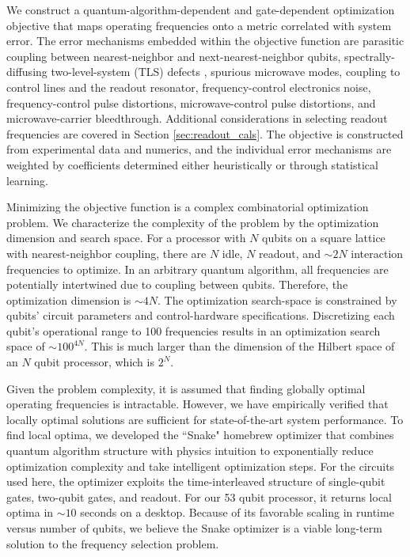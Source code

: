 We construct a quantum-algorithm-dependent and gate-dependent optimization objective that maps operating frequencies onto a metric correlated with system error.  The error mechanisms embedded within the objective function are parasitic coupling between nearest-neighbor and next-nearest-neighbor qubits, spectrally-diffusing two-level-system (TLS) defects \cite{paultls}, spurious microwave modes, coupling to control lines and the readout resonator, frequency-control electronics noise, frequency-control pulse distortions, microwave-control pulse distortions, and microwave-carrier bleedthrough. Additional considerations in selecting readout frequencies are covered in Section \ref{sec:readout_cals}. The objective is constructed from experimental data and numerics, and the individual error mechanisms are weighted by coefficients determined either heuristically or through statistical learning. 

Minimizing the objective function is a complex combinatorial optimization problem. We characterize the complexity of the problem by the optimization dimension and search space. For a processor with $N$ qubits on a square lattice with nearest-neighbor coupling, there are $N$ idle, $N$ readout, and $\sim2N$ interaction frequencies to optimize. In an arbitrary quantum algorithm, all frequencies are potentially intertwined due to coupling between qubits. Therefore, the optimization dimension is $\sim4N$. The optimization search-space is constrained by qubits' circuit parameters and control-hardware specifications. Discretizing each qubit's operational range to 100 frequencies results in an optimization search space of $\sim100^{4N}$. This is much larger than the dimension of the Hilbert space of an $N$ qubit processor, which is $2^N$. 

Given the problem complexity, it is assumed that finding globally optimal operating frequencies is intractable.  However, we have empirically verified that locally optimal solutions are sufficient for state-of-the-art system performance. To find local optima, we developed the ``Snake" homebrew optimizer that combines quantum algorithm structure with physics intuition to exponentially reduce optimization complexity and take intelligent optimization steps. For the circuits used here, the optimizer exploits the time-interleaved structure of single-qubit gates, two-qubit gates, and readout. For our 53 qubit processor, it returns local optima in $\sim10$ seconds on a desktop. Because of its favorable scaling in runtime versus number of qubits, we believe the Snake optimizer is a viable long-term solution to the frequency selection problem. 

